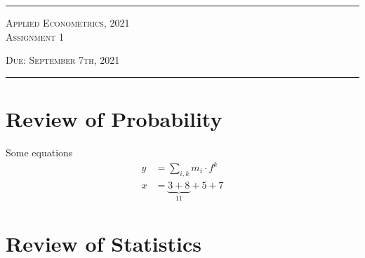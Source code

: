\documentclass[11pt]{article}
\begin{document}

\fancyhead[C]{}
\hrule \medskip 
\begin{minipage}{0.9\textwidth} 
\centering 
\large 
\textsc{Applied Econometrics, 2021}\\
\textsc{Assignment} 1\\ 
\normalsize 

\textsc{Due: September 7th, 2021} 
\end{minipage}
\medskip \hrule
\bigskip


\section{Review of Probability}

Some equations
\begin{align*}
y &=  \sum\limits_{i,k} m_i \cdot f^k \\
x &=  
\underset{11}{\underbrace{3 + 8}} + 5 + 7
\end{align*}

\section{Review of Statistics}

\bigskip





\end{document}
